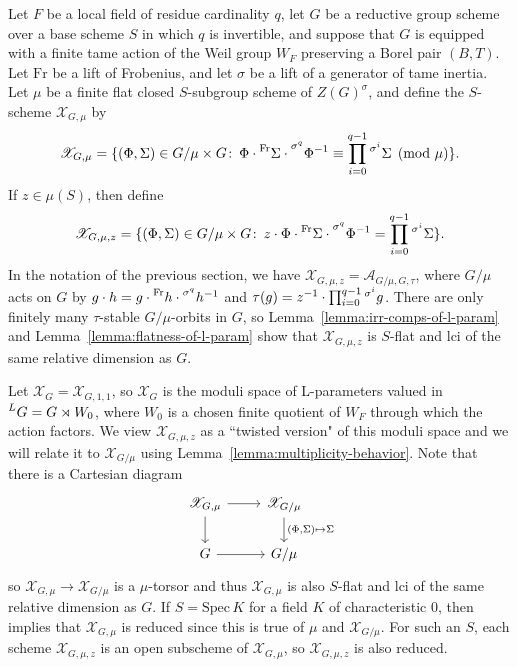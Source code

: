 \documentclass[11pt,reqno]{amsart}
\theoremstyle{definition}
\renewcommand{\rm}{\mathrm}
\newcommand{\Spec}{\mathrm{Spec} \,}
\newcommand{\sA}{{\mathscr A}}
\newcommand{\sX}{{\mathscr X}}
\begin{document}
Let $F$ be a local field of residue cardinality $q$, let $G$ be a reductive group scheme over a base scheme $S$ in which $q$ is invertible, and suppose that $G$ is equipped with a finite tame action of the Weil group $W_F$ preserving a Borel pair $(B, T)$. Let $\rm{Fr}$ be a lift of Frobenius, and let $\sigma$ be a lift of a generator of tame inertia. Let $\mu$ be a finite flat closed $S$-subgroup scheme of $Z(G)^\sigma$, and define the $S$-scheme $\sX_{G, \mu}$ by
\[
\sX_{G, \mu} = \{(\Phi, \Sigma) \in G/\mu \times G\colon\, \Phi\cdot \prescript{\rm{Fr}}{}{\Sigma} \cdot \prescript{\sigma^q}{}{\Phi^{-1}} \equiv \prod_{i=0}^{q-1} \prescript{\sigma^i}{}{\Sigma} \pmod{\mu}\}.
\]
If $z \in \mu(S)$, then define
\[
\sX_{G, \mu, z} = \{(\Phi, \Sigma) \in G/\mu \times G\colon\, z\cdot\Phi\cdot \prescript{\rm{Fr}}{}{\Sigma} \cdot \prescript{\sigma^q}{}{\Phi^{-1}} = \prod_{i=0}^{q-1} \prescript{\sigma^i}{}{\Sigma}\}.
\]
In the notation of the previous section, we have $\sX_{G, \mu, z} = \sA_{G/\mu, G, \tau}$, where $G/\mu$ acts on $G$ by $g \cdot h = g \cdot \prescript{\rm{Fr}}{}{h} \cdot \prescript{\sigma^q}{}{h}^{-1}$ and $\tau(g) = z^{-1} \cdot \prod_{i=0}^{q-1} \prescript{\sigma^i}{}{g}$. There are only finitely many $\tau$-stable $G/\mu$-orbits in $G$, so Lemma~\ref{lemma:irr-comps-of-l-param} and Lemma~\ref{lemma:flatness-of-l-param} show that $\sX_{G, \mu, z}$ is $S$-flat and lci of the same relative dimension as $G$.

Let $\sX_G = \sX_{G, 1, 1}$, so $\sX_G$ is the moduli space of L-parameters valued in $\prescript{L}{}{G} = G \rtimes W_0$, where $W_0$ is a chosen finite quotient of $W_F$ through which the action factors. We view $\sX_{G, \mu, z}$ as a ``twisted version" of this moduli space and we will relate it to $\sX_{G/\mu}$ using Lemma~\ref{lemma:multiplicity-behavior}. Note that there is a Cartesian diagram
\[
\begin{tikzcd}
    \sX_{G, \mu} \arrow[d] \arrow[r]
        &\sX_{G/\mu} \arrow[d, "{(\Phi, \Sigma)} \mapsto \Sigma"] \\
    G \arrow[r]
        &G/\mu
\end{tikzcd}
\]
so $\sX_{G,\mu} \to \sX_{G/\mu}$ is a $\mu$-torsor and thus $\sX_{G, \mu}$ is also $S$-flat and lci of the same relative dimension as $G$. If $S = \Spec K$ for a field $K$ of characteristic $0$, then \cite[Proposition 2.8]{DHKM} implies that $\sX_{G,\mu}$ is reduced since this is true of $\mu$ and $\sX_{G/\mu}$. For such an $S$, each scheme $\sX_{G,\mu,z}$ is an open subscheme of $\sX_{G,\mu}$, so $\sX_{G,\mu,z}$ is also reduced.
\end{document}
